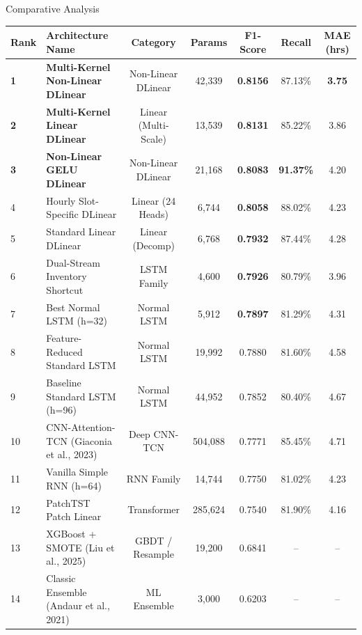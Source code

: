 \documentclass[10pt, aspectratio=169]{beamer}
\begin{document}
\begin{frame}{Comparative Analysis}
  \centering
  \small
  \begin{tabular}{llccccc}
    \toprule
    \textbf{Rank} & \textbf{Architecture Name} & \textbf{Category} & \textbf{Params} & \textbf{F1-Score} & \textbf{Recall} & \textbf{MAE (hrs)} \\
    \midrule
    \rowcolor{green!15} \textbf{1} & \textbf{Multi-Kernel Non-Linear DLinear} & Non-Linear DLinear & 42,339 & \textbf{0.8156} & 87.13\% & \textbf{3.75} \\
    \rowcolor{green!10} \textbf{2} & \textbf{Multi-Kernel Linear DLinear} & Linear (Multi-Scale) & 13,539 & \textbf{0.8131} & 85.22\% & 3.86 \\
    \rowcolor{green!5} \textbf{3} & \textbf{Non-Linear GELU DLinear} & Non-Linear DLinear & 21,168 & \textbf{0.8083} & \textbf{91.37\%} & 4.20 \\
    4 & Hourly Slot-Specific DLinear & Linear (24 Heads) & 6,744 & \textbf{0.8058} & 88.02\% & 4.23 \\
    5 & Standard Linear DLinear & Linear (Decomp) & 6,768 & \textbf{0.7932} & 87.44\% & 4.28 \\
    6 & Dual-Stream Inventory Shortcut & LSTM Family & 4,600 & \textbf{0.7926} & 80.79\% & 3.96 \\
    \rowcolor{blue!10} 7 & Best Normal LSTM (h=32) & Normal LSTM & 5,912 & \textbf{0.7897} & 81.29\% & 4.31 \\
    8 & Feature-Reduced Standard LSTM & Normal LSTM & 19,992 & 0.7880 & 81.60\% & 4.58 \\
    9 & Baseline Standard LSTM (h=96) & Normal LSTM & 44,952 & 0.7852 & 80.40\% & 4.67 \\
    10 & CNN-Attention-TCN (Giaconia et al., 2023) & Deep CNN-TCN & 504,088 & 0.7771 & 85.45\% & 4.71 \\
    11 & Vanilla Simple RNN (h=64) & RNN Family & 14,744 & 0.7750 & 81.02\% & 4.23 \\
    12 & PatchTST Patch Linear & Transformer & 285,624 & 0.7540 & 81.90\% & 4.16 \\
    13 & XGBoost + SMOTE (Liu et al., 2025) & GBDT / Resample & 19,200 & 0.6841 & -- & -- \\
    14 & Classic Ensemble (Andaur et al., 2021) & ML Ensemble & 3,000 & 0.6203 & -- & -- \\
    \bottomrule
  \end{tabular}
\end{frame}
\end{document}
